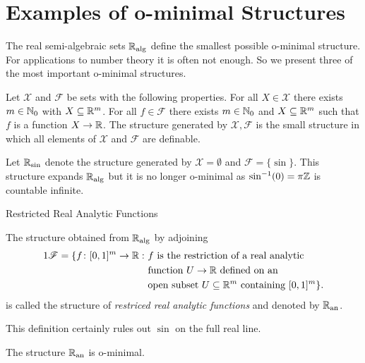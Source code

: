 \documentclass{beamer}
\begin{document}
\section{Examples of o-minimal Structures}

\begin{frame}
  The real semi-algebraic sets ${\mathbb{R}}_{\mathrm{alg}}$ define the smallest possible
  o-minimal structure. For applications to
  number theory it is often not enough. So we present three of the most
  important o-minimal structures.

  \begin{definition}
    Let $\mathscr{X}$ and $\mathscr{F}$ be sets with the following
    properties. For all $X\in \mathscr{X}$ there exists $m\in{\mathbb{N}}_0$ with
    $X\subseteq{\mathbb{R}}^m$. For all $f\in \mathscr{F}$ there exists $m\in{\mathbb{N}}_0$
    and $X\subseteq{\mathbb{R}}^m$ such that $f$ is a function $X\rightarrow{\mathbb{R}}$. The
    \alert{structure generated} by $\mathscr{X},\mathscr{F}$ is the small
    structure in which all elements of $\mathcal{X}$ and $\mathscr{F}$ are
    definable.
  \end{definition}

  \begin{example}
    Let ${\mathbb{R}}_{\sin}$ denote the structure generated by
    $\mathscr{X}=\emptyset$ and $\mathscr{F}=\{\sin \}$.
    This structure expands ${\mathbb{R}}_{\mathrm{alg}}$ but it is no longer o-minimal as
    $\sin^{-1}(0)=\pi{\mathbb{Z}}$ is countable infinite.
  \end{example}
\end{frame}

\begin{frame}{Restricted Real Analytic Functions}

  \begin{definition}
    The structure obtained from ${\mathbb{R}}_{\mathrm{alg}}$ by adjoining
    \begin{alignat*}1
      \mathscr{F} = \{f \colon [0,1]^m\rightarrow\IR:  \,\,&\text{$f$ is the
        restriction of a real analytic}\\&\text{function $U\rightarrow
        \IR$ defined on an}\\
      &\text{open subset
        $U\subset\IR^m$ containing $[0,1]^m$}\}.  
    \end{alignat*}
     is called the structure of \emph{restriced real analytic
       functions}
     and denoted by ${{\mathbb{R}}_{\mathrm{an}}}$.
  \end{definition}

  This definition certainly rules out $\sin$ on the full real line.

  \begin{theorem}[Gabrielov]
    The structure ${{\mathbb{R}}_{\mathrm{an}}}$ is o-minimal. 
  \end{theorem}
\end{frame}
\end{document}
